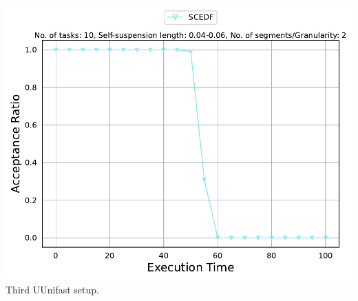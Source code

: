 \documentclass[]{article}
\begin{document}
\begin{minipage}[t]{0.48\linewidth}
            \includegraphics[width=\linewidth]{SCEDF[2][0.04-0.06][10].pdf}
		Third UUnifast setup.
		\vspace{0.3cm}
		
	\end{minipage}\hfill
\end{document}
